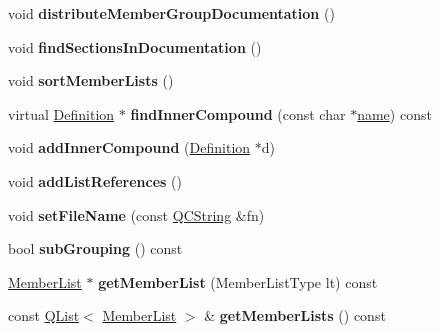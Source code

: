\begin{DoxyCompactItemize}
\item 
\mbox{\label{class_namespace_def_a94df90e63dbf4b65d7b1be2972bb7f03}} 
void {\bfseries distribute\+Member\+Group\+Documentation} ()
\item 
\mbox{\label{class_namespace_def_abdbe6e3d3e00c6b20c50cc9a5a0447de}} 
void {\bfseries find\+Sections\+In\+Documentation} ()
\item 
\mbox{\label{class_namespace_def_a7ad2c40126a71d97ca73f5709c4fcdaa}} 
void {\bfseries sort\+Member\+Lists} ()
\item 
\mbox{\label{class_namespace_def_aae1e39368726fc2869cf0a89a8f23767}} 
virtual \mbox{\hyperlink{class_definition}{Definition}} $\ast$ {\bfseries find\+Inner\+Compound} (const char $\ast$\mbox{\hyperlink{class_definition_a9324000f785d7b6b098878a3bca4df5b}{name}}) const
\item 
\mbox{\label{class_namespace_def_ab431efd27db6de103556a8def3478c3c}} 
void {\bfseries add\+Inner\+Compound} (\mbox{\hyperlink{class_definition}{Definition}} $\ast$d)
\item 
\mbox{\label{class_namespace_def_acc3c42d51f100c04730288dd00bb0d24}} 
void {\bfseries add\+List\+References} ()
\item 
\mbox{\label{class_namespace_def_a98d62a0a78794f8a65f021ee3a182138}} 
void {\bfseries set\+File\+Name} (const \mbox{\hyperlink{class_q_c_string}{Q\+C\+String}} \&fn)
\item 
\mbox{\label{class_namespace_def_a933ca099699f22ec2aba1aad562b436e}} 
bool {\bfseries sub\+Grouping} () const
\item 
\mbox{\label{class_namespace_def_aeff89307da1acb1d949e5613fea6100a}} 
\mbox{\hyperlink{class_member_list}{Member\+List}} $\ast$ {\bfseries get\+Member\+List} (Member\+List\+Type lt) const
\item 
\mbox{\label{class_namespace_def_a3ed26d5711d4c7523daca1349fd40f26}} 
const \mbox{\hyperlink{class_q_list}{Q\+List}}$<$ \mbox{\hyperlink{class_member_list}{Member\+List}} $>$ \& {\bfseries get\+Member\+Lists} () const

\end{DoxyCompactItemize}
